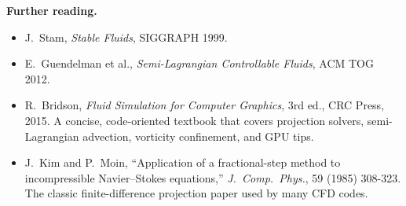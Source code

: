 \documentclass[11pt]{article}
\begin{document}

\bigskip
\noindent\textbf{Further reading.}
\begin{itemize}\setlength\itemsep{0.4em}

\item J.\ Stam, \emph{Stable Fluids}, SIGGRAPH 1999.   %
\item E.\ Guendelman et al., \emph{Semi-Lagrangian Controllable
      Fluids}, ACM TOG 2012.   %

\item R.\ Bridson, \emph{Fluid Simulation for Computer Graphics},
      3rd ed., CRC Press, 2015.  A concise, code-oriented textbook that
      covers projection solvers, semi-Lagrangian advection, vorticity
      confinement, and GPU tips.

\item J.\ Kim and P.\ Moin, “Application of a fractional-step method to
      incompressible Navier–Stokes equations,” \emph{J.\ Comp.\ Phys.},
      59 (1985) 308-323.  The classic finite-difference projection
      paper used by many CFD codes.



\end{itemize}
\end{document}
